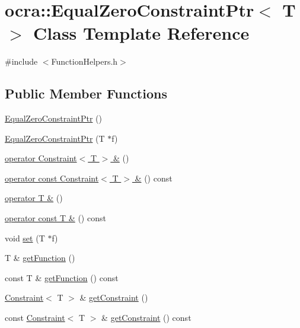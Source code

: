 \hypertarget{classocra_1_1EqualZeroConstraintPtr}{}\section{ocra\+:\+:Equal\+Zero\+Constraint\+Ptr$<$ T $>$ Class Template Reference}
\label{classocra_1_1EqualZeroConstraintPtr}


{\ttfamily \#include $<$Function\+Helpers.\+h$>$}

\subsection*{Public Member Functions}
\begin{DoxyCompactItemize}
\item 
\hyperlink{classocra_1_1EqualZeroConstraintPtr_a3c2ba882cedf01952626c420b3020b8f}{Equal\+Zero\+Constraint\+Ptr} ()
\item 
\hyperlink{classocra_1_1EqualZeroConstraintPtr_a6a3937dc3d22626cb3aaf3536256aee8}{Equal\+Zero\+Constraint\+Ptr} (T $\ast$f)
\item 
\hyperlink{classocra_1_1EqualZeroConstraintPtr_a46f26ad15e3bccb5d1566873f7389e5c}{operator Constraint$<$ T $>$ \&} ()
\item 
\hyperlink{classocra_1_1EqualZeroConstraintPtr_af74a366cabcea98bc6afb01ce8f3d700}{operator const Constraint$<$ T $>$ \&} () const 
\item 
\hyperlink{classocra_1_1EqualZeroConstraintPtr_a58ced9661521ab88f6960a7971453afd}{operator T \&} ()
\item 
\hyperlink{classocra_1_1EqualZeroConstraintPtr_ad6d9e96d6de85e720cfe4bdf9b4d6bea}{operator const T \&} () const 
\item 
void \hyperlink{classocra_1_1EqualZeroConstraintPtr_a3157efd4dbc5db4141fa688fd8032b78}{set} (T $\ast$f)
\item 
T \& \hyperlink{classocra_1_1EqualZeroConstraintPtr_a995f545eace80eb54d79dfcb48d724bd}{get\+Function} ()
\item 
const T \& \hyperlink{classocra_1_1EqualZeroConstraintPtr_a5fecf987ab8b6b250059103000b043f6}{get\+Function} () const 
\item 
\hyperlink{classocra_1_1Constraint}{Constraint}$<$ T $>$ \& \hyperlink{classocra_1_1EqualZeroConstraintPtr_a4d9b786f79ed2b84fac88e57f3d00404}{get\+Constraint} ()
\item 
const \hyperlink{classocra_1_1Constraint}{Constraint}$<$ T $>$ \& \hyperlink{classocra_1_1EqualZeroConstraintPtr_a7ebe0295013e46ec38c649b972bd35e7}{get\+Constraint} () const 
\end{DoxyCompactItemize}


